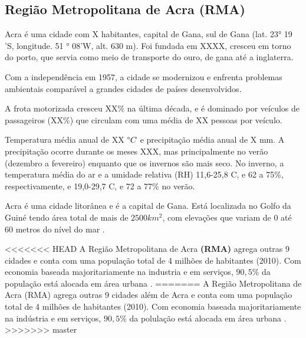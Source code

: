 
\subsection{Região Metropolitana de Acra (RMA)}

Acra é uma cidade com X habitantes, capital de Gana, 
sul de Gana (lat. 23° 19 'S, longitude. 51 ° 08'W, alt. 630 m). 
Foi fundada em XXXX, cresceu em torno do porto, que servia como meio de transporte
do ouro, de gana até a inglaterra. 

Com a independência em 1957, a cidade se modernizou e enfrenta problemas 
ambientais comparável a grandes cidades de países desenvolvidos. 

A frota motorizada cresceu XX\% na última década, e é dominado por veículos 
de passageiros (XX\%) que circulam com uma média de XX pessoas por veículo. 

Temperatura média anual de XX $\degree C$ e precipitação média anual de X mm. 
A precipitação ocorre durante os meses XXX, mas principalmente no verão 
(dezembro a fevereiro) enquanto que os invernos são mais seco. 
No inverno, a temperatura média do ar e a umidade relativa (RH) 11,6-25,8 C, 
e 62 a 75\%, respectivamente, e 19,0-29,7 C, e 72 a 77\% no verão. 


Acra é uma cidade litorânea e é a capital de Gana. Está localizada 
no Golfo da Guiné tendo área total de mais de  $2500 km^2$, com elevações que 
variam de 0 até 60 metros do nível do mar \citep{ARKU2008}.

<<<<<<< HEAD
A Região Metropolitana de Acra \textbf{(RMA)} agrega outras 9 cidades e 
conta com uma população total de 4 milhões de habitantes (2010). 
Com economia baseada majoritariamente na industria e em serviços, 
$90,5\%$ da população está alocada em área urbana \citep{ghanacensus2013}.
=======
A Região Metropolitana de Acra (RMA) agrega outras 9 cidades
além de Acra e conta com uma população total de 4 milhões de habitantes (2010). 
Com economia baseada majoritariamente na indústria e em serviços, 
$90,5\%$ da polulação está alocada em área urbana \citep{ghanacensus2013}.
>>>>>>> master

